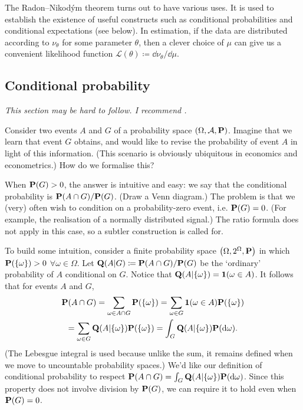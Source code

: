 \documentclass[11pt,letterpaper,reqno,oneside]{article}
\begin{document}
The Radon--Nikod\'{y}m theorem turns out to have various uses. It is used to establish the existence of useful constructs such as conditional probabilities and conditional expectations (see below). In estimation, if the data are distributed according to $\nu_\theta$ for some parameter $\theta$, then a clever choice of $\mu$ can give us a convenient likelihood function $\mathcal{L}(\theta) \coloneqq \dd \nu_\theta / \dd \mu$.



\subsection{Conditional probability}
\label{sec:probability:conditional_probability}

\emph{This section may be hard to follow. I recommend \textcite[][sec. 33]{Billingsley1995}.}

Consider two events $A$ and $G$ of a probability space $(\Omega,\mathcal{A},\mathbf{P})$. Imagine that we learn that event $G$ obtains, and would like to revise the probability of event $A$ in light of this information. (This scenario is obviously ubiquitous in economics and econometrics.) How do we formalise this?

When $\mathbf{P}(G)>0$, the answer is intuitive and easy: we say that the conditional probability is $\mathbf{P}(A \cap G) / \mathbf{P}(G)$. (Draw a Venn diagram.) The problem is that we (very) often wish to condition on a probability-zero event, i.e. $\mathbf{P}(G)=0$. (For example, the realisation of a normally distributed signal.) The ratio formula does not apply in this case, so a subtler construction is called for.

To build some intuition, consider a finite probability space $\left(\Omega,2^\Omega,\mathbf{P}\right)$ in which $\mathbf{P}(\{\omega\})>0$ $\forall \omega \in \Omega$. Let $\mathbf{Q}(A|G) \coloneqq \mathbf{P}(A \cap G) / \mathbf{P}(G)$ be the `ordinary' probability of $A$ conditional on $G$. Notice that $\mathbf{Q}(A|\{\omega\}) = \boldsymbol{1}( \omega \in A )$. It follows that for events $A$ and $G$,
%
\begin{multline*}
	\mathbf{P}(A \cap G)
	= \sum_{\omega \in A \cap G} \mathbf{P}(\{\omega\})
	= \sum_{\omega \in G} \boldsymbol{1}( \omega \in A ) \mathbf{P}(\{\omega\})
	\\
	= \sum_{\omega \in G} \mathbf{Q}( A | \{\omega\} ) \mathbf{P}(\{\omega\}) 
	= \int_G \mathbf{Q}( A | \{\omega\} ) \mathbf{P}(\mathrm{d}\omega) .
\end{multline*}
%
(The Lebesgue integral is used because unlike the sum, it remains defined when we move to uncountable probability spaces.) We'd like our definition of conditional probability to respect $\mathbf{P}(A \cap G) = \int_G \mathbf{Q}( A | \{\omega\} ) \mathbf{P}(\mathrm{d}\omega)$. Since this property does not involve division by $\mathbf{P}(G)$, we can require it to hold even when $\mathbf{P}(G)=0$.
\end{document}
